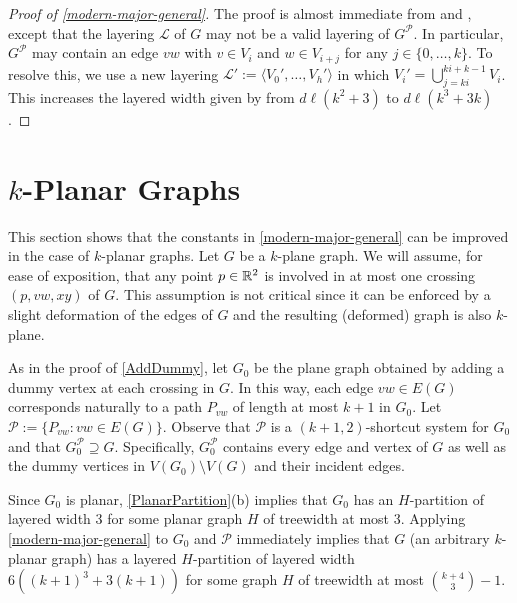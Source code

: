 \documentclass{patmorin}
\newcommand{\PP}{\mathcal{P}}
\begin{document}
\begin{proof}[Proof of \cref{modern-major-general}] 
  The proof is almost immediate from  and , except that the layering $\mathcal{L}$ of $G$ may not be a valid layering of $G^{\mathcal{P}}$.  In particular, $G^{\mathcal{P}}$ may contain an edge $vw$ with $v\in V_i$ and $w\in V_{i+j}$ for any $j\in\{0,\ldots,k\}$.  To resolve this, we use a new layering $\mathcal{L}':=\langle V_0',\ldots,V_h'\rangle$ in which $V_i'=\bigcup_{j=ki}^{ki+k-1} V_i$.  This increases the layered width given by  from $d\ell(k^2+3)$ to $d\ell(k^3+3k)$.
\end{proof}

\section{\boldmath $k$-Planar Graphs}
\label{sec-k-planar}

This section shows that the constants in \cref{modern-major-general} can be improved in the case of $k$-planar graphs. Let $G$ be a $k$-plane graph.  We will assume, for ease of exposition, that any point $p\in\mathbb{R}^2$ is involved in at most one crossing $(p,vw,xy)$ of $G$. This assumption is not critical since it can be enforced by a slight deformation of the edges of $G$ and the resulting (deformed) graph is also $k$-plane.  

As in the proof of \cref{AddDummy}, let $G_0$ be the plane graph obtained by adding a dummy vertex at each crossing in $G$. In this way, each edge $vw\in E(G)$ corresponds naturally to a path $P_{vw}$ of length at most $k+1$ in $G_0$.  Let $\PP := \{P_{vw}: vw\in E(G)\}$. Observe that $\PP$ is a $(k+1,2)$-shortcut system for $G_0$ and that $G_0^{\mathcal{P}}\supseteq G$.  Specifically, $G_0^{\mathcal{P}}$ contains every edge and vertex of $G$ as well as the dummy vertices in $V(G_0)\setminus V(G)$ and their incident edges.  

Since $G_0$ is planar,  \cref{PlanarPartition}(b) implies that $G_0$ has an $H$-partition of layered width 3 for some planar graph $H$ of treewidth at most 3.  Applying \cref{modern-major-general} to $G_0$ and $\mathcal{P}$ immediately implies that $G$ (an arbitrary $k$-planar graph) has a layered $H$-partition of layered width $6((k+1)^3+3(k+1))$ for some graph $H$ of treewidth at most $\binom{k+4}{3}-1$.
\end{document}
